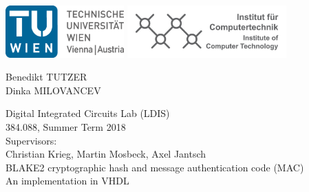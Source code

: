 \documentclass[%
	a4paper,
]
{article}
\begin{document}
%
\begin{titlepage}


	\includegraphics[height=2cm]{fig/logo-tu.png}%
	\hfill{}%
	\includegraphics[height=2cm]{fig/logo-ict.png}%
	

	\vspace{5em}

	\begin{center}

		\large
		Benedikt TUTZER\\
		Dinka MILOVANCEV\\
	

	\vspace{5em}

		{\huge Digital Integrated Circuits Lab (LDIS)}\\[1em]
		{\Large 384.088, Summer Term 2018} \\[2em]
		{\large Supervisors:\\[.5em]
			Christian Krieg, Martin Mosbeck, Axel Jantsch} \\[10em]

		{\Huge BLAKE2 cryptographic hash and message authentication code (MAC)}\\[2em]
		{\Large An implementation in VHDL}
		\\[8em]
	\end{center}


\begin{abstract}

		The task of our group was to implement \emph{BLAKE2b} hash function as
specified in \autocite{rfc7693}. The \emph{BLAKE2b} algorithm computation was
implemented using state machines, the implementation was syntactically correct
and synthesizable. The functional correctness was verified by using the
reference implementation given in C. The test bench compared the output of our
entity with the reference hash value for the same message input and reported
the result in terminal. For the message input we used the random data
generated by the Task 1 implementation. The \emph{BLAKE2b} hash function
entity is to be used as a component of \emph{Argon2} memory hard function
which should generate cryptographically secure keys from passwords as
specified in \autocite{irtf-cfrg-argon2-03}. The \emph{Argon2} function should
be implemented targeting \emph{Nexyx 4 DDR} board.
\end{abstract}
\end{titlepage}
%
%
%
%
\end{document}
